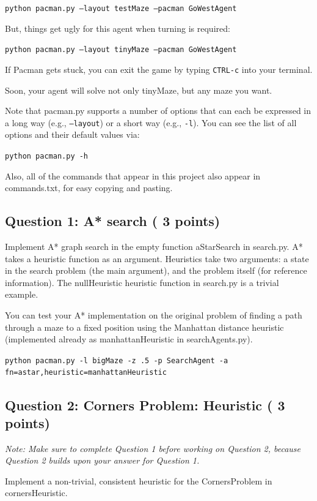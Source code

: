 \documentclass[a4paper, 11pt]{article}
\begin{document}
\texttt{python pacman.py --layout testMaze --pacman GoWestAgent}

But, things get ugly for this agent when turning is required:

\texttt{python pacman.py --layout tinyMaze --pacman GoWestAgent}

If Pacman gets stuck, you can exit the game by typing \texttt{CTRL-c} into your terminal.

Soon, your agent will solve not only \textsf{tinyMaze}, but any maze you want.

Note that \textsf{pacman.py} supports a number of options that can each be expressed in a long way (e.g., \texttt{--layout}) or a short way (e.g., \texttt{-l}). You can see the list of all options and their default values via:

\texttt{python pacman.py -h}

Also, all of the commands that appear in this project also appear in \textsf{commands.txt}, for easy copying and pasting.
\subsection{Question 1: A* search ( 3 points)}
Implement A* graph search in the empty function \textsf{aStarSearch} in \textsf{search.py}. A* takes a heuristic function as an argument. Heuristics take two arguments: a state in the search problem (the main argument), and the problem itself (for reference information). The \textsf{nullHeuristic} heuristic function in \textsf{search.py} is a trivial example.

You can test your A* implementation on the original problem of finding a path through a maze to a fixed position using the Manhattan distance heuristic (implemented already as \textsf{manhattanHeuristic} in \textsf{searchAgents.py}).

\texttt{python pacman.py -l bigMaze -z .5 -p SearchAgent -a fn=astar,heuristic=manhattanHeuristic}

\subsection{Question 2: Corners Problem: Heuristic ( 3 points)}
\textit{Note: Make sure to complete Question 1 before working on Question 2, because Question 2 builds upon your answer for Question 1.}

Implement a non-trivial, consistent heuristic for the \textsf{CornersProblem} in \textsf{cornersHeuristic}.
\end{document}
